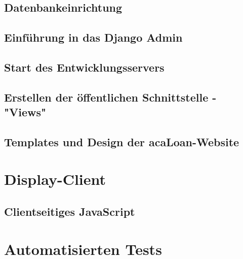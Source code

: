 \subsection{Datenbankeinrichtung}
\label{sec:server:database}

\subsection{Einführung in das Django Admin}
\label{sec:server:admin}

\subsection{Start des Entwicklungsservers}
\label{sec:server:server}

\subsection{Erstellen der öffentlichen Schnittstelle - "Views"}
\label{sec:server:views}

\subsection{Templates und Design der acaLoan-Website}
\label{sec:server:design}


\section{Display-Client}
\label{sec:display_client}

\subsection{Clientseitiges JavaScript}
\label{sec:display_client:js}


\section{Automatisierten Tests}
\label{sec:testing}